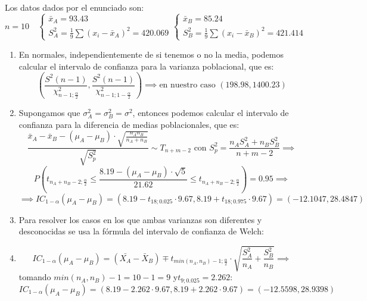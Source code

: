 \begin{sol}
    Los datos dados por el enunciado son: 
    $$n = 10 \quad \begin{cases}
        \bar{x}_A = 93.43 \\
        S^2_A = \frac{1}{9}\sum (x_i - \bar{x}_A)^2 = 420.069
    \end{cases}
    \begin{cases}
        \bar{x}_B = 85.24 \\
        S^2_B = \frac{1}{9}\sum (x_i - \bar{x}_B)^2 = 421.414
    \end{cases}$$
    \begin{enumerate}
        \item En normales, independientemente de si tenemos o no la media, podemos calcular el intervalo de confianza para la varianza poblacional, que es:
        $$\left(\frac{S^2(n-1)}{\chi_{n - 1 ;\frac{\alpha}{2}}^2}, \frac{S^2(n-1)}{\chi_{n - 1 ;1- \frac{\alpha}{2}}^2}\right) \implies \text{en nuestro caso } \left(198.98, 1400.23\right) $$
        \item Supongamos que $\sigma_A^2 = \sigma_B^2 = \sigma^2$, entonces podemos calcular el intervalo de confianza para la diferencia de medias poblacionales, que es:
        $$\frac{\bar{x}_A - \bar{x}_B - (\mu_A - \mu_B) \cdot \sqrt{\frac{n_A n_B}{n_A+n_B}}}{\sqrt{S_p^2}} \sim T_{n+m-2} \text{ con } S_p^2 = \frac{n_A S_A^2 + n_B S_B^2}{n+m-2} \implies$$
        $$P\left(t_{n_A + n_B - 2; \frac{\alpha}{2}} \leq \frac{8.19 - (\mu_A - \mu_B) \cdot \sqrt{5}}{21.62} \leq t_{n_A + n_B - 2; \frac{\alpha}{2}}\right) = 0.95 \implies$$
        $$\implies IC_{1 - \alpha}(\mu_A - \mu_B) = \left(8.19 - t_{18; 0.025} \cdot 9.67, 8.19 + t_{18; 0.975} \cdot 9.67\right) = (-12.1047, 28.4847)$$
        \item Para resolver los casos en los que ambas varianzas son diferentes y desconocidas se usa la fórmula del intervalo de confianza de Welch: 
        \item $$IC_{1 - \alpha}(\mu_A - \mu_B) = (\bar{X_A} - \bar{X}_B) \mp t_{min{(n_A, n_B)}-1; \frac{\alpha}{2}} \cdot \sqrt{\frac{S_A^2}{n_A} + \frac{S_B^2}{n_B}} \implies$$
        tomando $min(n_A, n_B) - 1= 10 -1 = 9$ y$t_{9; 0.025} = 2.262$:
        $$IC_{1 - \alpha}(\mu_A - \mu_B) = (8.19 - 2.262 \cdot 9.67, 8.19 + 2.262 \cdot 9.67) = (-12.5598, 28.9398)$$
    \end{enumerate}
\end{sol}
